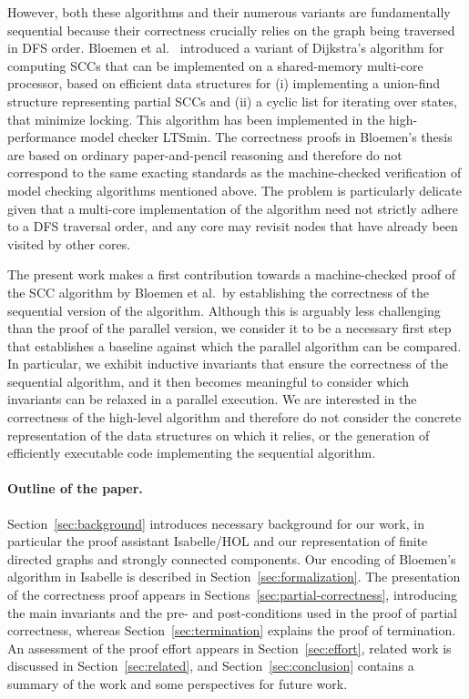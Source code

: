 \documentclass[sigplan,10pt,anonymous,review]{acmart}
\begin{document}
However, both these algorithms and their numerous variants are fundamentally sequential because their correctness crucially relies on the graph being traversed in DFS order. Bloemen et al.~\cite{bloemen:strong,bloemen:multi-core} introduced a variant of Dijkstra's algorithm for computing SCCs that can be implemented on a shared-memory multi-core processor, based on efficient data structures for (i) implementing a union-find structure representing partial SCCs and (ii) a cyclic list for iterating over states, that minimize locking. This algorithm has been implemented in the high-performance model checker LTSmin. The correctness proofs in Bloemen's thesis are based on ordinary paper-and-pencil reasoning and therefore do not correspond to the same exacting standards as the machine-checked verification of model checking algorithms mentioned above. The problem is particularly delicate given that a multi-core implementation of the algorithm need not strictly adhere to a DFS traversal order, and any core may revisit nodes that have already been visited by other cores.

The present work makes a first contribution towards a machine-checked proof of the SCC algorithm by Bloemen et al.\ by establishing the correctness of the sequential version of the algorithm. Although this is arguably less challenging than the proof of the parallel version, we consider it to be a necessary first step that establishes a baseline against which the parallel algorithm can be compared. In particular, we exhibit inductive invariants that ensure the correctness of the sequential algorithm, and it then becomes meaningful to consider which invariants can be relaxed in a parallel execution. We are interested in the correctness of the high-level algorithm and therefore do not consider the concrete representation of the data structures on which it relies, or the generation of efficiently executable code implementing the sequential algorithm.


\paragraph{Outline of the paper.}

Section~\ref{sec:background} introduces necessary background for our work, in particular the proof assistant Isabelle/HOL and our representation of finite directed graphs and strongly connected components. Our encoding of Bloemen's algorithm in Isabelle is described in Section~\ref{sec:formalization}. The presentation of the correctness proof appears in Sections~\ref{sec:partial-correctness}, introducing the main invariants and the pre- and post-conditions used in the proof of partial correctness, whereas Section~\ref{sec:termination} explains the proof of termination. An assessment of the proof effort appears in Section~\ref{sec:effort}, related work is discussed in Section~\ref{sec:related}, and Section~\ref{sec:conclusion} contains a summary of the work and some perspectives for future work.
\end{document}
